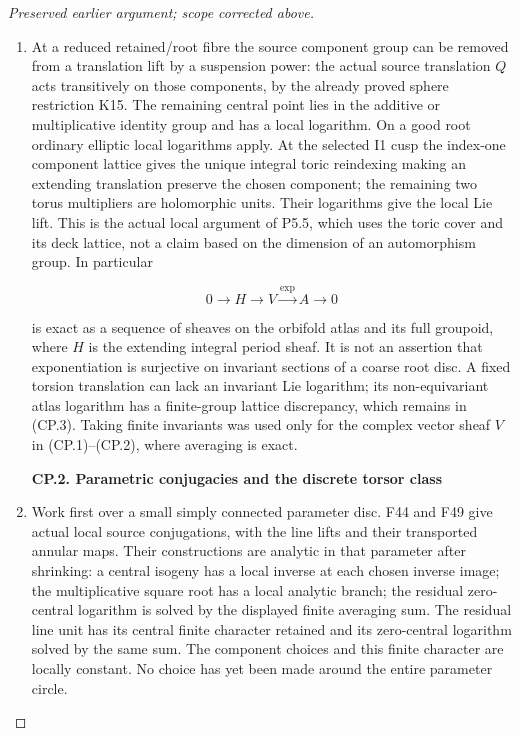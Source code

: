 \begin{proof}[Preserved earlier argument; scope corrected above]
\begin{enumerate}[label=\arabic*.]
\[
                       H^1(B,V)=0.                         \tag{CP.2}
\]

\item At a reduced retained/root fibre the source component group can be
removed from a translation lift by a suspension power: the actual
source translation \(Q\) acts transitively on those components, by the
already proved sphere restriction K15. The remaining central point
lies in the additive or multiplicative identity group and has a local
logarithm. On a good root ordinary elliptic local logarithms apply.
At the selected I1 cusp the index-one component lattice gives the
unique integral toric reindexing making an extending translation
preserve the chosen component; the remaining two torus multipliers
are holomorphic units. Their logarithms give the local Lie lift.
This is the actual local argument of P5.5, which uses the toric cover
and its deck lattice, not a claim based on the dimension of an
automorphism group. In particular

\[
 0\longrightarrow H\longrightarrow V\xrightarrow{\exp}A
       \longrightarrow0                                   \tag{CP.3}
\]

is exact as a sequence of sheaves on the orbifold atlas and its
full groupoid, where \(H\) is the extending integral period sheaf. It
is not an assertion that exponentiation is surjective on invariant
sections of a coarse root disc. A fixed torsion translation can lack
an invariant Lie logarithm; its non-equivariant atlas logarithm
has a finite-group lattice discrepancy, which remains in (CP.3).
Taking finite invariants was used only for the complex vector sheaf
\(V\) in (CP.1)--(CP.2), where averaging is exact.

\par

\medskip\noindent\textbf{CP.2. Parametric conjugacies and the discrete torsor class}

\par\nobreak

\item Work first over a small simply connected parameter disc. F44 and F49
give actual local source conjugations, with the line lifts and their
transported annular maps. Their constructions are analytic in that
parameter after shrinking: a central isogeny has a local inverse at
each chosen inverse image; the multiplicative square root has a local
analytic branch; the residual zero-central logarithm is solved by the
displayed finite averaging sum. The residual line unit has its
central finite character retained and its zero-central logarithm
solved by the same sum. The component choices and this finite
character are locally constant. No choice has yet been made around
the entire parameter circle.


\end{enumerate}
\end{proof}
